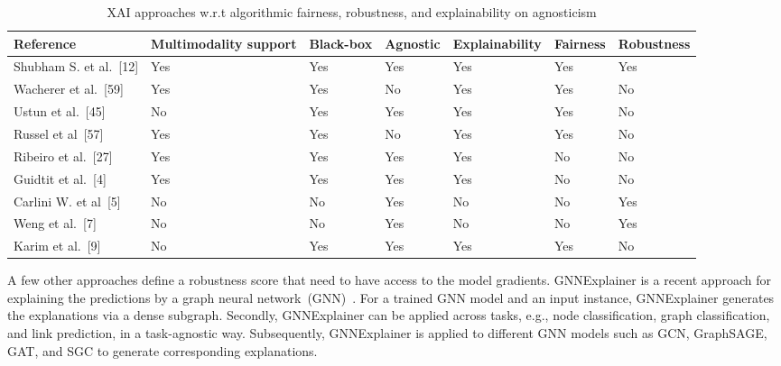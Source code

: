\begin{table}[h]
    \centering
    \caption{XAI approaches w.r.t algorithmic fairness, robustness, and explainability on agnosticism}
    \label{tab:multimodal_xai_approaches}
    \scriptsize
    \vspace{-2mm}
    \begin{tabular}{l|l|l|l|l|l|l} 
        \hline
        \textbf{Reference}                & \textbf{Multimodality support} & \textbf{Black-box} & \textbf{Agnostic} & \textbf{Explainability} & \textbf{Fairness} & \textbf{Robustness}  \\ 
        \hline
        Shubham S. et al.~[12]   & Yes                   & Yes       & Yes            & Yes            & Yes      & Yes         \\ 
        \hline
        Wacherer et al.~[59]     & Yes                   & Yes       & No             & Yes            & Yes      & No          \\ 
        \hline
        Ustun et al.~[45]        & No                    & Yes       & Yes            & Yes            & Yes      & No          \\ 
        \hline
        Russel et al~[57]       & Yes                   & Yes       & No             & Yes            & Yes      & No          \\ 
        \hline
        Ribeiro et al.~[27]      & Yes                   & Yes       & Yes            & Yes            & No       & No          \\ 
        \hline
        Guidtit et al.~[4]      & Yes                   & Yes       & Yes            & Yes            & No       & No          \\ 
        \hline
        Carlini W. et al~[5] & No                    & No        & Yes            & No             & No       & Yes         \\ 
        \hline
        Weng et al.~[7]          & No                    & No        & Yes            & No             & No       & Yes         \\ 
        \hline
        Karim et al.~[9]        & No                    & Yes       & Yes            & Yes            & Yes      & No          \\
        \hline
    \end{tabular}
    \vspace{-4mm}
\end{table}

\hspace*{3.5mm} A few other approaches define a robustness score that need to have access to the model gradients. GNNExplainer is a recent approach for explaining the predictions by a graph neural network~(GNN)~\cite{ying2019gnnexplainer}. For a trained GNN model and an input instance, GNNExplainer generates the explanations via a dense subgraph. Secondly, GNNExplainer can be applied across tasks, e.g., node classification, graph classification, and link prediction, in a task-agnostic way. Subsequently, GNNExplainer is applied to different GNN models such as GCN, GraphSAGE, GAT, and SGC to generate corresponding explanations. 

